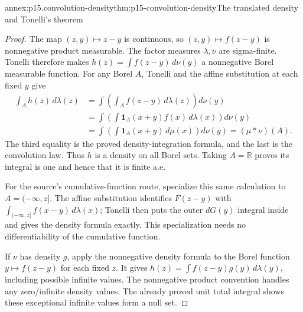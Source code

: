 \begin{annexitem}{annex:p15.convolution-density}{thm:p15-convolution-density}{The translated density and Tonelli's theorem}
\begin{proof}
The map \((z,y)\mapsto z-y\) is continuous, so
\((z,y)\mapsto f(z-y)\) is nonnegative product measurable.
The factor measures \(\lambda,\nu\) are sigma-finite. Tonelli
therefore makes \(h(z)=\int f(z-y)\,d\nu(y)\) a nonnegative
Borel measurable function. For any Borel \(A\), Tonelli and
the affine substitution at each fixed \(y\) give
\[
 \begin{aligned}
 \int_A h(z)\,d\lambda(z)
   &=\int\left(\int_A f(z-y)\,d\lambda(z)\right)d\nu(y)\\
   &=\int\left(\int\mathbf1_A(x+y)f(x)\,d\lambda(x)\right)d\nu(y)\\
   &=\int\left(\int\mathbf1_A(x+y)\,d\mu(x)\right)d\nu(y)
     =(\mu*\nu)(A).
 \end{aligned}
\]
The third equality is the proved density-integration formula, and
the last is the convolution law. Thus \(h\) is a density on
all Borel sets. Taking \(A=\mathbb R\) proves its integral
is one and hence that it is finite a.e.

For the source's cumulative-function route, specialize this same
calculation to \(A=(-\infty,z]\). The affine substitution
identifies \(F(z-y)\) with
\(\int_{(-\infty,z]}f(x-y)\,d\lambda(x)\); Tonelli then
puts the outer \(dG(y)\) integral inside and gives the density
formula exactly. This specialization needs no differentiability
of the cumulative function.

If \(\nu\) has density \(g\), apply the nonnegative density
formula to the Borel function \(y\mapsto f(z-y)\) for each
fixed \(z\). It gives
\(h(z)=\int f(z-y)g(y)\,d\lambda(y)\), including possible
infinite values. The nonnegative product convention handles any
zero/infinite density values. The already proved unit total
integral shows these exceptional infinite values form a null set.
\end{proof}
\end{annexitem}

